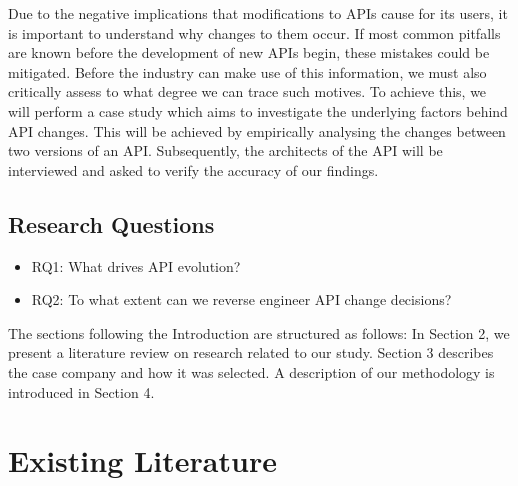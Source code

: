 \documentclass[10pt,twocolumn]{article}
\begin{document}
Due to the negative implications that modifications to APIs cause for its users, it is important to understand why changes to them occur. If most common pitfalls are known before the development of new APIs begin, these mistakes could be mitigated. Before the industry can make use of this information, we must also critically assess to what degree we can trace such motives. To achieve this, we will perform a case study which aims to investigate the underlying factors behind API changes. This will be achieved by empirically analysing the changes between two versions of an API. Subsequently, the architects of the API will be interviewed and asked to verify the accuracy of our findings. 



\subsection{Research Questions}
\begin{itemize}
\item RQ1: What drives API evolution? 
\item RQ2: To what extent can we reverse engineer API change decisions?
\end{itemize}

The sections following the Introduction are structured as follows: In Section 2, we present a literature review on research related to our study. Section 3 describes the case company and how it was selected. A description of our methodology is introduced in Section 4. 

\section{Existing Literature}
\end{document}
